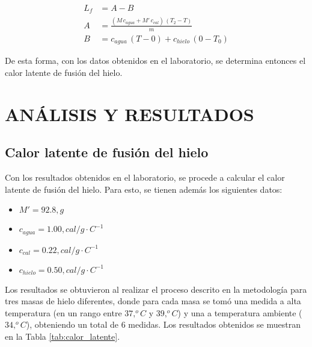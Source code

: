 \documentclass[10pt]{article}
\begin{document}
\begin{multicols*}{2}
\begin{itemize}
            \begin{equation}
                \begin{split}
                    L_f &= A - B \\
                    A &= \frac{(M \, c_{agua} + M' \, c_{cal}) \, (T_2 - T)}{m} \\
                    B &= c_{agua} \, (T - 0) + c_{hielo} \, (0 - T_0)
                \end{split}
                \label{eq:calor_latente_3}
            \end{equation}

            De esta forma, con los datos obtenidos en el laboratorio, se determina entonces el calor latente de fusión del hielo.
    \end{itemize}




    \section{\small ANÁLISIS Y RESULTADOS}
        \subsection*{\small Calor latente de fusión del hielo}
        Con los resultados obtenidos en el laboratorio, se procede a calcular el calor latente de fusión del hielo. Para esto, se tienen además los siguientes datos:

        \begin{itemize}
            \item $M' = 92.8 , g$
            \item $c_{agua} = 1.00 , cal/g \cdot C^{-1}$
            \item $c_{cal} = 0.22 , cal/g \cdot C^{-1}$
            \item $c_{hielo} = 0.50 , cal/g \cdot C^{-1}$
        \end{itemize}

        Los resultados se obtuvieron al realizar el proceso descrito en la metodología para tres masas de hielo diferentes, donde para cada masa se tomó una medida a alta temperatura (en un rango entre $37 , ^oC$ y $39 , ^oC$) y una a temperatura ambiente ($34 , ^oC$), obteniendo un total de 6 medidas. Los resultados obtenidos se muestran en la Tabla \ref{tab:calor_latente}.


\end{multicols*}
\end{document}
